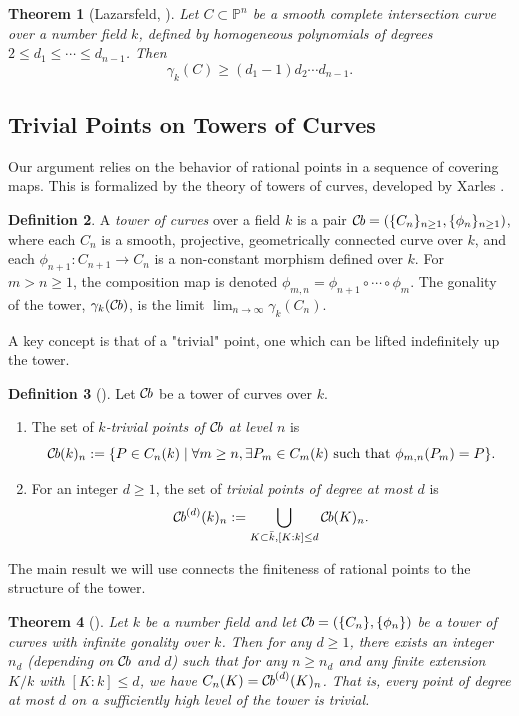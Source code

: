 \documentclass[11pt, a4paper]{amsart}
\newtheorem{thm}{Theorem}[section]
\theoremstyle{definition}
\newtheorem{defn}[thm]{Definition}
\newcommand{\Pp}{\mathbb{P}}
\newcommand{\kk}{\bar{k}}
\newcommand{\Cb}{\mathcal{C}\hskip-1.5pt\textit{b}} %
\begin{document}
\begin{thm}[Lazarsfeld, \cite{Lazarsfeld1997}]
	\label{Lazarsfeld1997}
	Let $C \subset \Pp^n$ be a smooth complete intersection curve over a number field $k$, defined by homogeneous polynomials of degrees $2 \leq d_1 \leq \cdots \leq d_{n-1}$. Then
	\[ \gamma_k(C) \geq (d_1-1)d_2 \cdots d_{n-1}. \]
\end{thm}

\subsection{Trivial Points on Towers of Curves}
Our argument relies on the behavior of rational points in a sequence of covering maps. This is formalized by the theory of towers of curves, developed by Xarles \cite{Xarles2013}.

\begin{defn}
	A \textit{tower of curves} over a field $k$ is a pair $\Cb = (\{C_n\}_{n \geq 1}, \{\phi_n\}_{n \geq 1})$, where each $C_n$ is a smooth, projective, geometrically connected curve over $k$, and each $\phi_{n+1}: C_{n+1} \to C_n$ is a non-constant morphism defined over $k$. For $m > n \geq 1$, the composition map is denoted $\phi_{m,n} = \phi_{n+1} \circ \cdots \circ \phi_m$. The gonality of the tower, $\gamma_k(\Cb)$, is the limit $\lim_{n \to \infty} \gamma_k(C_n)$.
\end{defn}

A key concept is that of a "trivial" point, one which can be lifted indefinitely up the tower.

\begin{defn}[\cite{Xarles2013}]
	Let $\Cb$ be a tower of curves over $k$.
	\begin{enumerate}
		\item The set of \textit{$k$-trivial points of $\Cb$ at level $n$} is
		\[ \Cb(k)_n := \{ P \in C_n(k) \mid \forall m \ge n, \exists P_m \in C_m(k) \text{ such that } \phi_{m,n}(P_m) = P \}. \]
		\item For an integer $d \ge 1$, the set of \textit{trivial points of degree at most $d$} is
		\[ \Cb^{(d)}(k)_n := \bigcup_{K \subset \kk, [K:k] \le d} \Cb(K)_n. \]
	\end{enumerate}
\end{defn}

The main result we will use connects the finiteness of rational points to the structure of the tower.

\begin{thm}[\cite{Xarles2013}]
	\label{xarles_thm}
	Let $k$ be a number field and let $\Cb = (\{C_n\}, \{\phi_n\})$ be a tower of curves with infinite gonality over $k$. Then for any $d \ge 1$, there exists an integer $n_d$ (depending on $\Cb$ and $d$) such that for any $n \ge n_d$ and any finite extension $K/k$ with $[K:k] \le d$, we have $C_n(K) = \Cb^{(d)}(K)_n$. That is, every point of degree at most $d$ on a sufficiently high level of the tower is trivial.
\end{thm}
\end{document}
